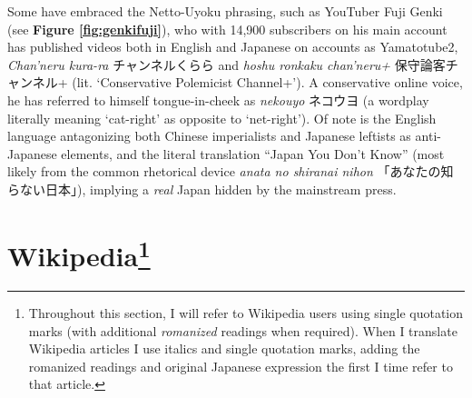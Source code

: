 \documentclass[10pt,british,A4paper,,openany]{memoir}
\begin{document}
Some have embraced the Netto-Uyoku phrasing, such as YouTuber Fuji Genki
(see \textbf{Figure \ref{fig:genkifuji}}), who with 14,900 subscribers
on his main account has published videos both in English and Japanese on
accounts as Yamatotube2, \emph{Chan'neru kura-ra} チャンネルくらら and
\emph{hoshu ronkaku chan'neru+} 保守論客チャンネル+ (lit. `Conservative
Polemicist Channel+'). A conservative online voice, he has referred to
himself tongue-in-cheek as \emph{nekouyo} ネコウヨ (a wordplay literally
meaning `cat-right' as opposite to `net-right'). Of note is the English
language antagonizing both Chinese imperialists and Japanese leftists as
anti-Japanese elements, and the literal translation ``Japan You Don't
Know'' (most likely from the common rhetorical device \emph{anata no
shiranai nihon} 「あなたの知らない日本」), implying a \emph{real} Japan
hidden by the mainstream press.

\section[Wikipedia]{\texorpdfstring{Wikipedia\footnote{Throughout this
  section, I will refer to Wikipedia users using single quotation marks
  (with additional \emph{romanized} readings when required). When I
  translate Wikipedia articles I use italics and single quotation marks,
  adding the romanized readings and original Japanese expression the
  first I time refer to that article.}}{Wikipedia}}\label{wikipedia76}
\end{document}
